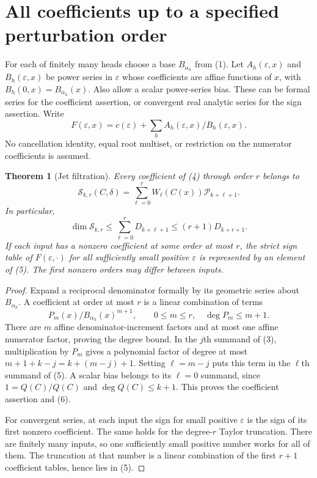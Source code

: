 \documentclass[11pt]{article}
\newtheorem{theorem}{Theorem}
\begin{document}
\section{All coefficients up to a specified perturbation order}

For each of finitely many heads choose a base $B_{\alpha_h}$ from
(1). Let $A_h(\varepsilon,x)$ and
$B_h(\varepsilon,x)$ be power series in $\varepsilon$ whose
coefficients are affine functions of $x$, with
$B_h(0,x)=B_{\alpha_h}(x)$. Also allow a scalar power-series bias.
These can be formal series for the coefficient assertion, or
convergent real analytic series for the sign assertion. Write
\[
 F(\varepsilon,x)=c(\varepsilon)+
                       \sum_h A_h(\varepsilon,x)/B_h(\varepsilon,x).
 \tag{4}
\]
No cancellation identity, equal root multiset, or restriction on the
numerator coefficients is assumed.

\begin{theorem}[Jet filtration]
Every coefficient of (4) through order $r$ belongs to
\[
 \mathcal S_{k,r}(C,\delta)
       =\sum_{\ell=0}^r W_\ell(C(x))\mathcal P_{k+\ell+1}.
 \tag{5}
\]
In particular,
\[
 \dim\mathcal S_{k,r}\le\sum_{\ell=0}^r D_{k+\ell+1}
                   \le(r+1)D_{k+r+1}.
 \tag{6}
\]
If each input has a nonzero coefficient at some order at most $r$,
the strict sign table of $F(\varepsilon,\cdot)$ for all sufficiently
small positive $\varepsilon$ is represented by an element of (5).
The first nonzero orders may differ between inputs.
\end{theorem}
\begin{proof}
Expand a reciprocal denominator formally by its geometric series
about $B_{\alpha_h}$. A coefficient at order at most $r$ is a
linear combination of terms
\[
                    P_m(x)/B_{\alpha_h}(x)^{m+1},
             \qquad 0\le m\le r,\quad \deg P_m\le m+1.
 \tag{7}
\]
There are $m$ affine denominator-increment factors and at most one
affine numerator factor, proving the degree bound. In the $j$th
summand of (3), multiplication by $P_m$ gives a polynomial factor
of degree at most $m+1+k-j=k+(m-j)+1$. Setting $\ell=m-j$
puts this term in the $\ell$th summand of (5). A scalar bias
belongs to its $\ell=0$ summand, since $1=Q(C)/Q(C)$ and
$\deg Q(C)\le k+1$. This proves the coefficient assertion and (6).

For convergent series, at each input the sign for small positive
$\varepsilon$ is the sign of its first nonzero coefficient. The
same holds for the degree-$r$ Taylor truncation. There are finitely
many inputs, so one sufficiently small positive number works for
all of them. The truncation at that number is a linear combination
of the first $r+1$ coefficient tables, hence lies in (5).
\end{proof}
\end{document}
